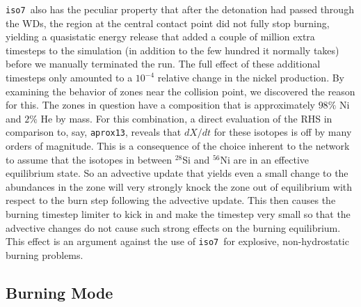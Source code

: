 \documentclass[twocolumn,numberedappendix]{../aastex6}
\newcommand{\isoseven}{\texttt{iso7}}
\newcommand{\aproxthirteen}{\texttt{aprox13}}
\begin{document}
\isoseven\ also has the peculiar property that after the detonation had passed through the WDs,
the region at the central contact point did not fully stop burning, yielding a quasistatic energy
release that added a couple of million extra timesteps to the simulation (in addition to the few
hundred it normally takes) before we manually terminated the run. The full effect of these additional
timesteps only amounted to a $10^{-4}$ relative change in the nickel production. By examining the behavior
of zones near the collision point, we discovered the reason for this. The zones in question have a composition that
is approximately $98\%$ Ni and $2\%$ He by mass. For this combination, a direct evaluation of the RHS in
comparison to, say, \aproxthirteen, reveals that $dX/dt$ for these isotopes is off by many orders of magnitude.
This is a consequence of the choice inherent to the network to assume that the isotopes in between $^{28}$Si
and $^{56}$Ni are in an effective equilibrium state. So an advective update that yields even a small change
to the abundances in the zone will very strongly knock the zone out of equilibrium with respect to the burn
step following the advective update. This then causes the burning timestep limiter to kick in and make the
timestep very small so that the advective changes do not cause such strong effects on the burning equilibrium.
This effect is an argument against the use of \isoseven\ for explosive, non-hydrostatic burning problems.



\subsection{Burning Mode}
\label{sec:parameters:burningmode}
\end{document}
